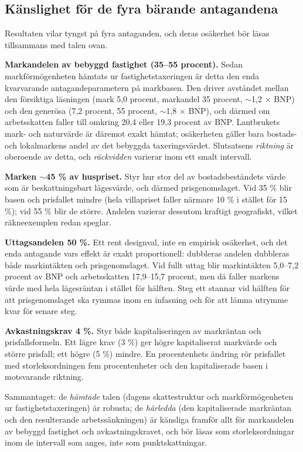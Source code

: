 \documentclass[11pt]{article}
\begin{document}
\subsection*{Känslighet för de fyra bärande antagandena}

Resultaten vilar tyngst på fyra antaganden, och deras osäkerhet bör läsas tillsammans med talen ovan.

\textbf{Markandelen av bebyggd fastighet (35--55 procent).} Sedan markförmögenheten hämtats ur fastighetstaxeringen är detta den enda kvarvarande antagandeparametern på markbasen. Den driver avståndet mellan den försiktiga läsningen (mark 5,0 procent, markandel 35 procent, $\sim$1,2 $\times$ BNP) och den generösa (7,2 procent, 55 procent, $\sim$1,8 $\times$ BNP), och därmed om arbetsskatten faller till omkring 20,4 eller 19,3 procent av BNP. Lantbrukets mark- och naturvärde är däremot exakt hämtat; osäkerheten gäller bara bostads- och lokalmarkens andel av det bebyggda taxeringsvärdet. Slutsatsens \emph{riktning} är oberoende av detta, och \emph{räckvidden} varierar inom ett smalt intervall.

\textbf{Marken $\sim$45 \% av huspriset.} Styr hur stor del av bostadsbeståndets värde som är beskattningsbart lägesvärde, och därmed prisgenomslaget. Vid 35 \% blir basen och prisfallet mindre (hela villapriset faller närmare 10 \% i stället för 15 \%); vid 55 \% blir de större. Andelen varierar dessutom kraftigt geografiskt, vilket räkneexemplen redan speglar.

\textbf{Uttagsandelen 50 \%.} Ett rent designval, inte en empirisk osäkerhet, och det enda antagande vars effekt är exakt proportionell: dubbleras andelen dubbleras både markintäkten och prisgenomslaget. Vid fullt uttag blir markintäkten 5,0--7,2 procent av BNP och arbetsskatten 17,9--15,7 procent, men då faller markens värde med hela lägesräntan i stället för hälften. Steg ett stannar vid hälften för att prisgenomslaget ska rymmas inom en infasning och för att lämna utrymme kvar för senare steg.

\textbf{Avkastningskrav 4 \%.} Styr både kapitaliseringen av markräntan och prisfallsformeln. Ett lägre krav (3 \%) ger högre kapitaliserat markvärde och större prisfall; ett högre (5 \%) mindre. En procentenhets ändring rör prisfallet med storleksordningen fem procentenheter och den kapitaliserade basen i motsvarande riktning.

Sammantaget: de \emph{hämtade} talen (dagens skattestruktur och markförmögenheten ur fastighetstaxeringen) är robusta; de \emph{härledda} (den kapitaliserade markräntan och den resulterande arbetssänkningen) är känsliga framför allt för markandelen av bebyggd fastighet och avkastningskravet, och bör läsas som storleksordningar inom de intervall som anges, inte som punktskattningar.
\end{document}
